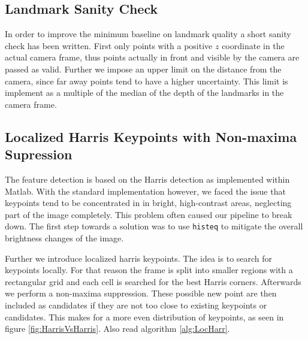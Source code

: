 \documentclass{article}
\begin{document}
\subsection{Landmark Sanity Check}

In order to improve the minimum baseline on landmark quality a short sanity check has been written. First only points with a positive $z$ coordinate in the actual camera frame, thus points actually in front and visible by the camera are passed as valid. Further we impose an upper limit on the distance from the camera, since far away points tend to have a higher uncertainty. This limit is implement as a multiple of the median of the depth of the landmarks in the camera frame.


\subsection{Localized Harris Keypoints with Non-maxima Supression}

The feature detection is based on the Harris detection as implemented within Matlab. With the standard implementation however, we faced the issue that keypoints tend to be concentrated in in bright, high-contrast areas, neglecting part of the image completely. This problem often caused our pipeline to break down. The first step towards a solution was to use \verb+histeq+ to mitigate the overall brightness changes of the image. %

Further we introduce localized harris keypoints. The idea is to search for keypoints locally. For that reason the frame is split into smaller regions with a rectangular grid and each cell is searched for the best Harris corners. Afterwards we perform a non-maxima suppression. These possible new point are then included as candidates if they are not too close to existing keypoints or candidates. This makes for a more even distribution of keypoints, as seen in figure \ref{fig:HarrisVsHarris}. Also read algorithm \ref{alg:LocHarr}.
\end{document}
